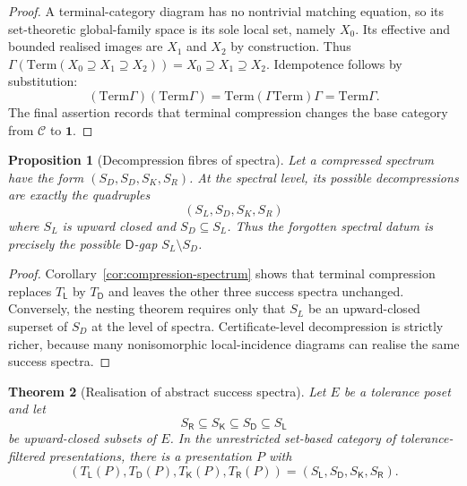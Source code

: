 \documentclass[11pt]{article}
\theoremstyle{plain}
\newtheorem{theorem}{Theorem}[section]
\newtheorem{proposition}[theorem]{Proposition}
\theoremstyle{definition}
\theoremstyle{remark}
\begin{document}
\begin{proof}
A terminal-category diagram has no nontrivial matching equation, so its
set-theoretic global-family space is its sole local set, namely $X_0$. Its
effective and bounded realised images are $X_1$ and $X_2$ by construction. Thus
$\Gamma(\mathrm{Term}(X_0\supseteq X_1\supseteq X_2))=X_0\supseteq X_1\supseteq
X_2$. Idempotence follows by substitution:
\[
(\mathrm{Term}\Gamma)(\mathrm{Term}\Gamma)
=\mathrm{Term}(\Gamma\mathrm{Term})\Gamma
=\mathrm{Term}\Gamma.
\]
The final assertion records that terminal compression changes the base category
from $\mathcal C$ to $\mathbf 1$.
\end{proof}

\begin{proposition}[Decompression fibres of spectra]
\label{prop:decompression-fibres-monograph}
Let a compressed spectrum have the form
$(S_D,S_D,S_K,S_R)$. At the spectral level, its possible decompressions are
exactly the quadruples
\[
(S_L,S_D,S_K,S_R)
\]
where $S_L$ is upward closed and $S_D\subseteq S_L$. Thus the forgotten spectral
datum is precisely the possible $\mathsf D$-gap $S_L\setminus S_D$.
\end{proposition}

\begin{proof}
Corollary~\ref{cor:compression-spectrum} shows that terminal compression replaces
$T_{\mathsf L}$ by $T_{\mathsf D}$ and leaves the other three success spectra
unchanged. Conversely, the nesting theorem requires only that $S_L$ be an
upward-closed superset of $S_D$ at the level of spectra. Certificate-level
decompression is strictly richer, because many nonisomorphic local-incidence
diagrams can realise the same success spectra.
\end{proof}

\begin{theorem}[Realisation of abstract success spectra]
\label{thm:abstract-spectrum-realisation}
Let $E$ be a tolerance poset and let
\[
S_{\mathsf R}\subseteq S_{\mathsf K}\subseteq S_{\mathsf D}\subseteq S_{\mathsf L}
\]
be upward-closed subsets of $E$. In the unrestricted set-based category of
tolerance-filtered presentations, there is a presentation $P$ with
\[
(T_{\mathsf L}(P),T_{\mathsf D}(P),T_{\mathsf K}(P),T_{\mathsf R}(P))
=(S_{\mathsf L},S_{\mathsf D},S_{\mathsf K},S_{\mathsf R}).
\]
\end{theorem}
\end{document}
